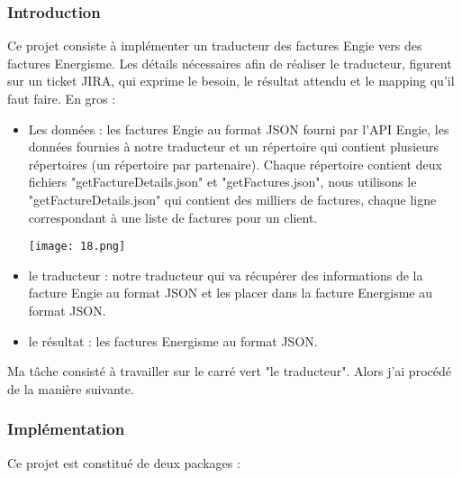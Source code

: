\subsubsection{Introduction}
Ce projet consiste à implémenter un traducteur des factures Engie vers des factures Energisme. Les détails nécessaires afin de réaliser le traducteur, figurent sur un ticket JIRA, qui exprime le besoin, le résultat attendu et le mapping qu'il faut faire. En gros :
\begin{itemize}
	\item Les données : les factures Engie au format JSON fourni par l'API Engie, les données fournies à notre traducteur et un répertoire qui contient plusieurs répertoires (un répertoire par partenaire). Chaque répertoire contient deux fichiers "getFactureDetails.json" et "getFactures.json", nous utilisons le "getFactureDetails.json" qui contient des milliers de factures, chaque ligne correspondant à une liste de factures pour un client.
	\begin{center}
		\texttt{[image: 18.png]}
	\end{center}
	\item le traducteur : notre traducteur qui va récupérer des informations de la facture Engie au format JSON et les placer dans la facture Energisme au format JSON.
	\item le résultat : les factures Energisme au format JSON. 
\end{itemize}
Ma tâche consisté à travailler sur le carré vert "le traducteur". Alors j'ai procédé de la manière suivante.
\subsubsection{Implémentation}
Ce projet est constitué de deux packages :\\


